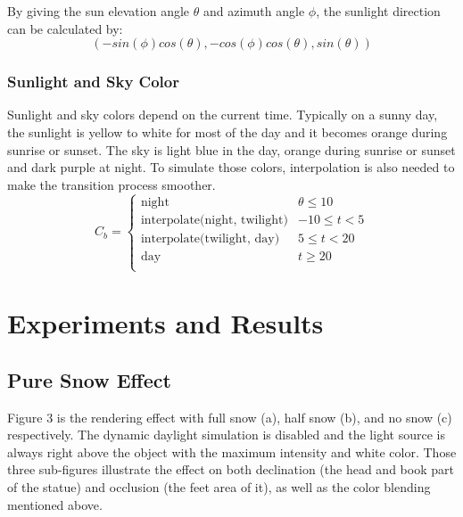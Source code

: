 \documentclass{article}
\begin{document}
By giving the sun elevation angle \( \theta \) and azimuth angle \( \phi \), the sunlight direction can be calculated by:
\[
  (-sin(\phi)cos(\theta), -cos(\phi)cos(\theta), sin(\theta))
\]

\subsubsection {Sunlight and Sky Color}
Sunlight and sky colors depend on the current time. Typically on a sunny day, the sunlight is yellow to white for most of the day and 
it becomes orange during sunrise or sunset. The sky is light blue in the day, orange during sunrise or sunset and dark purple at night. 
To simulate those colors, interpolation is also needed to make the transition process smoother. 
\[
  C_{b}=
  \left\{
    \begin{array}{ll}
      \text{night} & \theta \leq 10 \\
      \text{interpolate(night, twilight)} &  -10 \leq t < 5 \\
      \text{interpolate(twilight, day)} &  5 \leq t < 20 \\
      \text{day} & t \geq 20 \\
    \end{array} 
  \right. 
\]

\section{Experiments and Results}

\subsection {Pure Snow Effect}
Figure 3 is the rendering effect with full snow (a), half snow (b), and no snow (c) respectively. The dynamic daylight simulation is 
disabled and the light source is always right above the object with the maximum intensity and white color. Those three sub-figures 
illustrate the effect on both declination (the head and book part of the statue) and occlusion (the feet area of it), as well as the 
color blending mentioned above.
\end{document}
